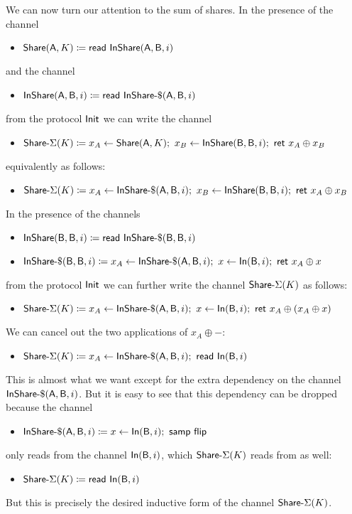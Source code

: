 \begin{itemize}
We can now turn our attention to the sum of shares. In the presence of the channel
\begin{itemize}
\item $\mathsf{Share}(\mathsf{A},K) \coloneqq \mathsf{read} \ \mathsf{InShare}(\mathsf{A},\mathsf{B},i)$
\end{itemize}
and the channel
\begin{itemize}
\item $\mathsf{InShare}(\mathsf{A},\mathsf{B},i) \coloneqq \mathsf{read} \ \mathsf{InShare}\textsf{-}\$(\mathsf{A},\mathsf{B},i)$
\end{itemize}
from the protocol $\mathsf{Init}$ we can write the channel
\begin{itemize}
\item $\mathsf{Share}\textsf{-}\Sigma(K) \coloneqq x_A \leftarrow \mathsf{Share}(\mathsf{A},K); \ x_B \leftarrow \mathsf{InShare}(\mathsf{B},\mathsf{B},i); \ \mathsf{ret} \ x_A \oplus x_B$
\end{itemize}
equivalently as follows:
\begin{itemize}
\item $\mathsf{Share}\textsf{-}\Sigma(K) \coloneqq x_A \leftarrow \mathsf{InShare}\textsf{-}\$(\mathsf{A},\mathsf{B},i); \ x_B \leftarrow \mathsf{InShare}(\mathsf{B},\mathsf{B},i); \ \mathsf{ret} \ x_A \oplus x_B$
\end{itemize}
In the presence of the channels
\begin{itemize}
\item $\mathsf{InShare}(\mathsf{B},\mathsf{B},i) \coloneqq \mathsf{read} \ \mathsf{InShare}\textsf{-}\$(\mathsf{B},\mathsf{B},i)$ 
\item $\mathsf{InShare}\textsf{-}\$(\mathsf{B},\mathsf{B},i) \coloneqq x_A \leftarrow \mathsf{InShare}\textsf{-}\$(\mathsf{A},\mathsf{B},i); \ x \leftarrow \mathsf{In}(\mathsf{B},i); \ \mathsf{ret} \ x_A \oplus x$
\end{itemize}
from the protocol $\mathsf{Init}$ we can further write the channel $\mathsf{Share}\textsf{-}\Sigma(K)$ as follows:
\begin{itemize}
\item $\mathsf{Share}\textsf{-}\Sigma(K) \coloneqq x_A \leftarrow \mathsf{InShare}\textsf{-}\$(\mathsf{A},\mathsf{B},i); \ x \leftarrow \mathsf{In}(\mathsf{B},i); \ \mathsf{ret} \ x_A \oplus (x_A \oplus x)$
\end{itemize}
We can cancel out the two applications of $x_A \oplus -$:
\begin{itemize}
\item $\mathsf{Share}\textsf{-}\Sigma(K) \coloneqq x_A \leftarrow \mathsf{InShare}\textsf{-}\$(\mathsf{A},\mathsf{B},i); \ \mathsf{read} \ \mathsf{In}(\mathsf{B},i)$
\end{itemize}
This is almost what we want except for the extra dependency on the channel $\mathsf{InShare}\textsf{-}\$(\mathsf{A},\mathsf{B},i)$. But it is easy to see that this dependency can be dropped because the channel
\begin{itemize}
\item $\mathsf{InShare}\textsf{-}\$(\mathsf{A},\mathsf{B},i) \coloneqq x \leftarrow \mathsf{In}(\mathsf{B},i); \ \mathsf{samp} \ \mathsf{flip}$
\end{itemize}
only reads from the channel $\mathsf{In}(\mathsf{B},i)$, which $\mathsf{Share}\textsf{-}\Sigma(K)$ reads from as well: \begin{itemize}
\item $\mathsf{Share}\textsf{-}\Sigma(K) \coloneqq \mathsf{read} \ \mathsf{In}(\mathsf{B},i)$
\end{itemize}
But this is precisely the desired inductive form of the channel $\mathsf{Share}\textsf{-}\Sigma(K)$.


\end{itemize}
